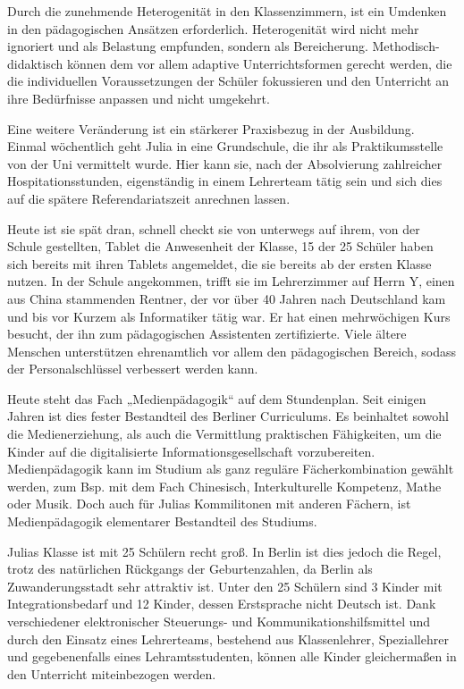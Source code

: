 \documentclass[12pt,a4paper]{article}
\begin{document}
\begin{appendix}
Durch die zunehmende Heterogenität in den Klassenzimmern, ist ein Umdenken in den pädagogischen Ansätzen erforderlich. Heterogenität wird nicht mehr ignoriert und als Belastung empfunden, sondern als Bereicherung. Methodisch-didaktisch können dem vor allem adaptive Unterrichtsformen gerecht werden, die die individuellen Voraussetzungen der Schüler fokussieren und den Unterricht an ihre Bedürfnisse anpassen und nicht umgekehrt.

Eine weitere Veränderung ist ein stärkerer Praxisbezug in der Ausbildung. Einmal wöchentlich geht Julia in eine Grundschule, die ihr als Praktikumsstelle von der Uni vermittelt wurde. Hier kann sie, nach der Absolvierung zahlreicher Hospitationsstunden, eigenständig in einem Lehrerteam tätig sein und sich dies auf die spätere Referendariatszeit anrechnen lassen.

Heute ist sie spät dran, schnell checkt sie von unterwegs auf ihrem, von der Schule gestellten, Tablet die Anwesenheit der Klasse, 15 der 25 Schüler haben sich bereits mit ihren Tablets angemeldet, die sie bereits ab der ersten Klasse nutzen.
In der Schule angekommen, trifft sie im Lehrerzimmer auf Herrn Y, einen  aus China stammenden Rentner, der vor über 40 Jahren nach Deutschland kam und bis vor Kurzem als Informatiker tätig war. Er hat einen mehrwöchigen Kurs besucht, der ihn zum pädagogischen Assistenten zertifizierte. Viele ältere Menschen unterstützen ehrenamtlich vor allem den pädagogischen Bereich, sodass der Personalschlüssel verbessert werden kann.

Heute steht das Fach „Medienpädagogik“ auf dem Stundenplan. Seit einigen Jahren ist dies fester Bestandteil des Berliner Curriculums. Es beinhaltet sowohl die Medienerziehung, als auch die Vermittlung praktischen Fähigkeiten, um die Kinder auf die digitalisierte Informationsgesellschaft vorzubereiten. Medienpädagogik kann im Studium als ganz reguläre Fächer\-kombi\-nation gewählt werden, zum Bsp. mit dem Fach Chinesisch, Interkulturelle Kompetenz, Mathe oder Musik.
Doch auch für Julias Kommilitonen mit anderen Fächern, ist Medienpädagogik elementarer Bestandteil des Studiums.

Julias Klasse ist mit 25 Schülern recht groß. In Berlin ist dies jedoch die Regel, trotz des natürlichen Rückgangs der Geburtenzahlen, da Berlin als Zuwanderungsstadt sehr attraktiv ist. Unter den 25 Schülern sind 3 Kinder mit Integrationsbedarf und 12 Kinder, dessen Erstsprache nicht Deutsch ist. Dank verschiedener elektronischer Steuerungs- und Kommunikationshilfsmittel und durch den Einsatz eines Lehrerteams, bestehend aus Klassenlehrer, Speziallehrer und gegebenenfalls eines Lehramtsstudenten, können alle Kinder gleichermaßen in den Unterricht miteinbezogen werden.


\end{appendix}
\end{document}
